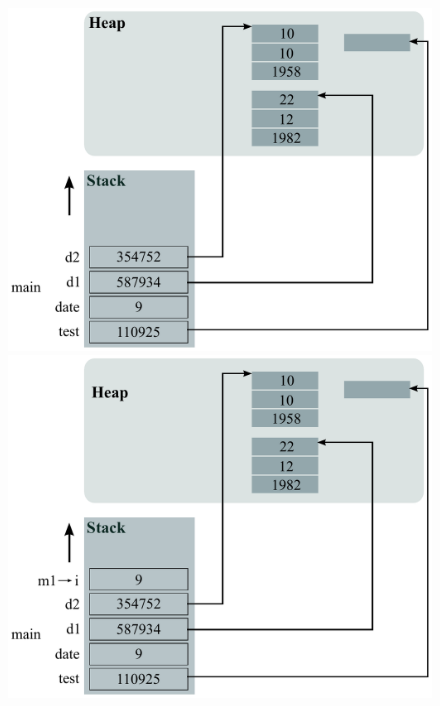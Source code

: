 \begin{figure}[htb]
  \begin{minipage}[t]{0.5\linewidth}
    \centering
    \includegraphics[width=\textwidth]{images/Java-memory-allocation/fig01.pdf}
  \end{minipage}%
  \begin{minipage}[t]{0.5\linewidth}
    \centering
    \includegraphics[width=\textwidth]{images/Java-memory-allocation/fig02.pdf}
  \end{minipage}
\end{figure}


